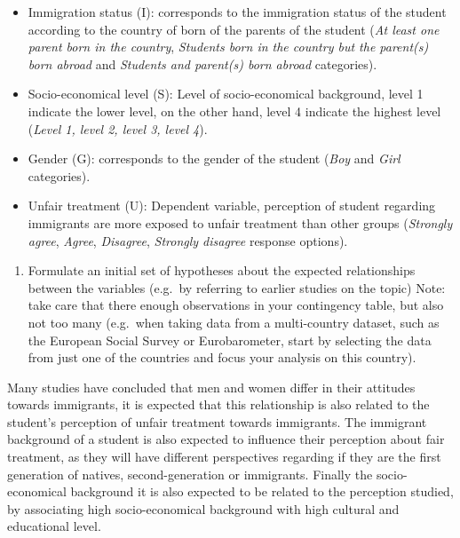 \documentclass[
  12pt,
]{article}
\providecommand{\tightlist}{%
  \setlength{\itemsep}{0pt}\setlength{\parskip}{0pt}}
\begin{document}
\begin{itemize}
\tightlist
\item
  Immigration status (I): corresponds to the immigration status of the student according to the country of born of the parents of the student (\emph{At least one parent born in the country}, \emph{Students born in the country but the parent(s) born abroad} and \emph{Students and parent(s) born abroad} categories).\\
\item
  Socio-economical level (S): Level of socio-economical background, level 1 indicate the lower level, on the other hand, level 4 indicate the highest level (\emph{Level 1, level 2, level 3, level 4}).\\
\item
  Gender (G): corresponds to the gender of the student (\emph{Boy} and \emph{Girl} categories).\\
\item
  Unfair treatment (U): Dependent variable, perception of student regarding immigrants are more exposed to unfair treatment than other groups (\emph{Strongly agree}, \emph{Agree}, \emph{Disagree}, \emph{Strongly disagree} response options).
\end{itemize}

\begin{enumerate}
\def\labelenumi{\alph{enumi}.}
\setcounter{enumi}{2}
\tightlist
\item
  Formulate an initial set of hypotheses about the expected relationships between the variables (e.g.~by referring to earlier studies on the topic) Note: take care that there enough observations in your contingency table, but also not too many (e.g.~when taking data from a multi-country dataset, such as the European Social Survey or Eurobarometer, start by selecting the data from just one of the countries and focus your analysis on this country).
\end{enumerate}

Many studies have concluded that men and women differ in their attitudes towards immigrants, it is expected that this relationship is also related to the student's perception of unfair treatment towards immigrants. The immigrant background of a student is also expected to influence their perception about fair treatment, as they will have different perspectives regarding if they are the first generation of natives, second-generation or immigrants. Finally the socio-economical background it is also expected to be related to the perception studied, by associating high socio-economical background with high cultural and educational level.
\end{document}
